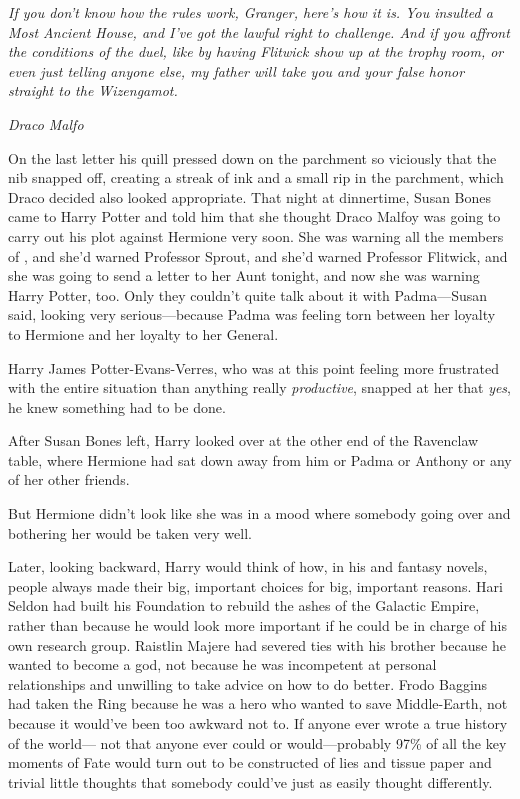 \emph{If you don’t know how the rules work, Granger, here’s how it
is. You insulted a Most Ancient House, and I’ve got the lawful
right to challenge. And if you affront the conditions of the duel,
like by having Flitwick show up at the trophy room, or even just
telling anyone else, my father will take you and your false honor
straight to the Wizengamot.}

\emph{Draco Malfo}

On the last letter his quill pressed down on the parchment so
viciously that the nib snapped off, creating a streak of ink and a
small rip in the parchment, which Draco decided also looked
appropriate.
\sbreak
That night at dinnertime, Susan Bones came to Harry Potter and
told him that she thought Draco Malfoy was going to carry out his
plot against Hermione very soon. She was warning all the members of
\SPHEW, and she’d warned Professor Sprout, and she’d warned
Professor Flitwick, and she was going to send a letter to her Aunt
tonight, and now she was warning Harry Potter, too. Only they
couldn’t quite talk about it with Padma—Susan said, looking very
serious—because Padma was feeling torn between her loyalty to
Hermione and her loyalty to her General.

Harry James Potter-Evans-Verres, who was at this point feeling
more frustrated with the entire situation than anything really
\emph{productive}, snapped at her that \emph{yes}, he knew
something had to be done.

After Susan Bones left, Harry looked over at the other end of
the Ravenclaw table, where Hermione had sat down away from him or
Padma or Anthony or any of her other friends.

But Hermione didn’t look like she was in a mood where somebody
going over and bothering her would be taken very well.

Later, looking backward, Harry would think of how, in his  and
fantasy novels, people always made their big, important choices for
big, important reasons. Hari Seldon had built his Foundation to
rebuild the ashes of the Galactic Empire, rather than because he
would look more important if he could be in charge of his own
research group. Raistlin Majere had severed ties with his brother
because he wanted to become a god, not because he was incompetent
at personal relationships and unwilling to take advice on how to do
better. Frodo Baggins had taken the Ring because he was a hero who
wanted to save Middle-Earth, not because it would’ve been too
awkward not to. If anyone ever wrote a true history of the world—
not that anyone ever could or would—probably 97\% of all the key
moments of Fate would turn out to be constructed of lies and tissue
paper and trivial little thoughts that somebody could’ve just as
easily thought differently.

